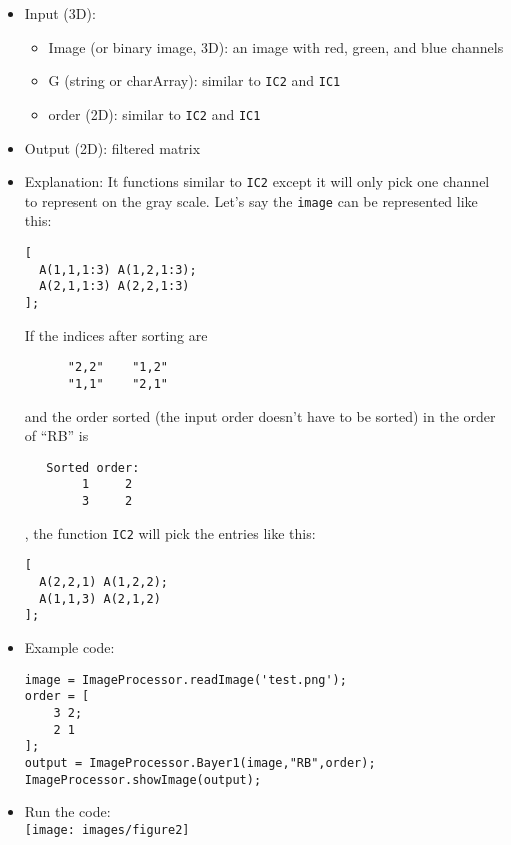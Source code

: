 \documentclass[11pt]{amsart}
\theoremstyle{remark}
\providecommand{\tightlist}{%
  \setlength{\itemsep}{0pt}\setlength{\parskip}{0pt}}
\theoremstyle{definition}
\theoremstyle{remark}
\numberwithin{equation}{section}
\begin{document}
\begin{itemize}
\item
  Input (3D):

  \begin{itemize}
  \tightlist
  \item
    Image (or binary image, 3D): an image with red, green, and blue
    channels
  \item
    G (string or charArray): similar to \texttt{IC2} and \texttt{IC1}
  \item
    order (2D): similar to \texttt{IC2} and \texttt{IC1}
  \end{itemize}
\item
  Output (2D): filtered matrix
\item
  Explanation: It functions similar to \texttt{IC2} except it will only
  pick one channel to represent on the gray scale. Let's say the
  \texttt{image} can be represented like this:

\begin{verbatim}
[
  A(1,1,1:3) A(1,2,1:3);
  A(2,1,1:3) A(2,2,1:3)
];
\end{verbatim}

  If the indices after sorting are

\begin{verbatim}
      "2,2"    "1,2"
      "1,1"    "2,1"
\end{verbatim}

  and the order sorted (the input order doesn't have to be sorted) in
  the order of ``RB'' is

\begin{verbatim}
   Sorted order:
        1     2
        3     2
\end{verbatim}

  , the function \texttt{IC2} will pick the entries like this:

\begin{verbatim}
[
  A(2,2,1) A(1,2,2);
  A(1,1,3) A(2,1,2)
];
\end{verbatim}
\item
  Example code:

\begin{verbatim}
image = ImageProcessor.readImage('test.png');
order = [
    3 2;
    2 1
];
output = ImageProcessor.Bayer1(image,"RB",order);
ImageProcessor.showImage(output);
\end{verbatim}
\item
  Run the code:\\
  \texttt{[image: images/figure2]}
\end{itemize}
\end{document}
